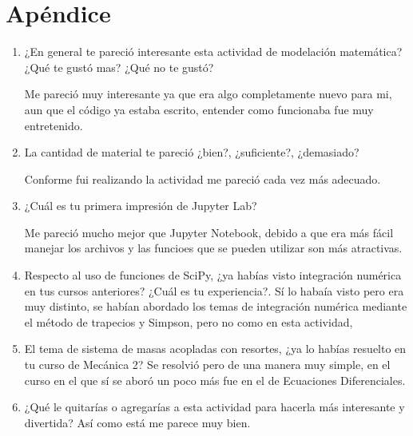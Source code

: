 \documentclass{article}
\begin{document}
\section{Apéndice}
\begin{enumerate}
\item ¿En general te pareció interesante esta actividad de modelación matemática? ¿Qué te gustó mas? ¿Qué no te gustó?

Me pareció muy interesante ya que era algo completamente nuevo para mi, aun que el código ya estaba escrito, entender como funcionaba fue muy entretenido.

\item La cantidad de material te pareció ¿bien?, ¿suficiente?, ¿demasiado?

Conforme fui realizando la actividad me pareció cada vez más adecuado.

\item ¿Cuál es tu primera impresión de Jupyter Lab?

Me pareció mucho mejor que Jupyter Notebook, debido a que era más fácil manejar los archivos y las funcioes que se pueden utilizar son más atractivas.

\item Respecto al uso de funciones de SciPy, ¿ya habías visto integración numérica en tus cursos anteriores? ¿Cuál es tu experiencia?.
Sí lo habaía visto pero era muy distinto, se habían abordado los temas de integración numérica mediante el método de trapecios y Simpson, pero no como en esta actividad, 

\item El tema de sistema de masas acopladas con resortes, ¿ya lo habías resuelto en tu curso de Mecánica 2? 
Se resolvió pero de una manera muy simple, en el curso en el que sí se aboró un poco más fue en el de Ecuaciones Diferenciales.

\item¿Qué le quitarías o agregarías a esta actividad para hacerla más interesante y divertida?
Así como está me parece muy bien.
\end{enumerate}
\end{document}
